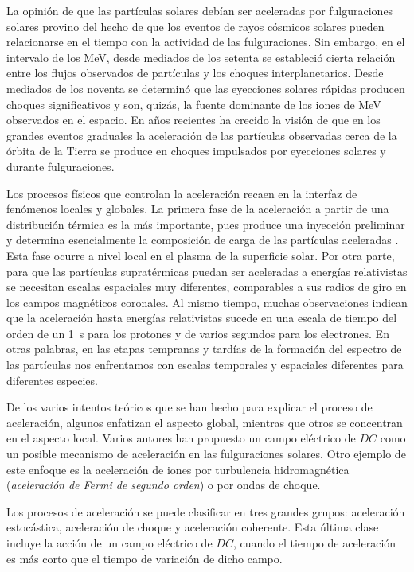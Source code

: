 La opinión de que las partículas solares debían ser aceleradas por fulguraciones solares provino del hecho de que los eventos de rayos cósmicos solares pueden relacionarse en el tiempo con la actividad de las fulguraciones. Sin embargo, en el intervalo de los \si{\mega\electronvolt}, desde mediados de los setenta se estableció cierta relación entre los flujos observados de partículas y los choques interplanetarios. Desde mediados de los noventa se determinó que las eyecciones solares rápidas producen choques significativos y son, quizás, la fuente dominante de los iones de \si{\mega\electronvolt} observados en el espacio. En años recientes ha crecido la visión de que en los grandes eventos graduales la aceleración de las partículas observadas cerca de la órbita de la Tierra se produce en choques impulsados por eyecciones solares y durante fulguraciones.

Los procesos físicos que controlan la aceleración recaen en la interfaz de fenómenos locales y globales. La primera fase de la aceleración a partir de una distribución térmica es la más importante, pues produce una inyección preliminar y determina esencialmente la composición de carga de las partículas aceleradas \cite{mirosh15}. Esta fase ocurre a nivel local en el plasma de la superficie solar. Por otra parte, para que las partículas supratérmicas puedan ser aceleradas a energías relativistas se necesitan escalas espaciales muy diferentes, comparables a sus radios de giro en los campos magnéticos coronales. Al mismo tiempo, muchas observaciones indican que la aceleración hasta energías relativistas sucede en una escala de tiempo del orden de un \SI{1}{\second} para los protones y de varios segundos para los electrones. En otras palabras, en las etapas tempranas y tardías de la formación del espectro de las partículas nos enfrentamos con escalas temporales y espaciales diferentes para diferentes especies.

De los varios intentos teóricos que se han hecho para explicar el proceso de aceleración, algunos enfatizan el aspecto global, mientras que otros se concentran en el aspecto local. Varios autores han propuesto un campo eléctrico de $DC$ como un posible mecanismo de aceleración en las fulguraciones solares. Otro ejemplo de este enfoque es la aceleración de iones por turbulencia hidromagnética (\emph{aceleración de Fermi de segundo orden}) o por ondas de choque.

Los procesos de aceleración se puede clasificar en tres grandes grupos: aceleración estocástica, aceleración de choque y aceleración coherente. Esta última clase incluye la acción de un campo eléctrico de $DC$, cuando el tiempo de aceleración es más corto que el tiempo de variación de dicho campo.

